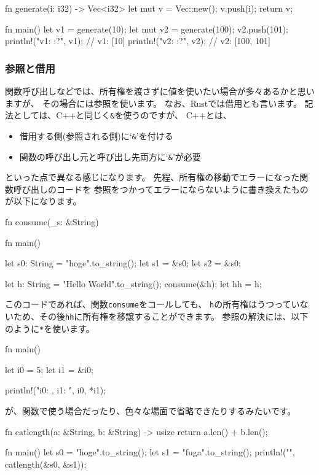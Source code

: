 \documentclass[mingoth,a4paper]{jsarticle}
\begin{document}
\begin{commandline}
fn generate(i: i32) -> Vec<i32> {
    let mut v = Vec::new();
    v.push(i);
    return v;
}

fn main() {
    let v1 = generate(10);
    let mut v2 = generate(100);
    v2.push(101);
    println!("v1: {:?}", v1); // v1: [10]
    println!("v2: {:?}", v2); // v2: [100, 101]
}
\end{commandline}

\subsubsection{参照と借用}

関数呼び出しなどでは、所有権を渡さずに値を使いたい場合が多々あるかと思いますが、
その場合には参照を使います。
なお、Rustでは借用とも言います。
記法としては、C++と同じく\texttt{\&}を使うのですが、
C++とは、
\begin{itemize}
 \item 借用する側(参照される側)に`\texttt{\&}'を付ける
 \item 関数の呼び出し元と呼び出し先両方に`\texttt{\&}'が必要
\end{itemize}
といった点で異なる感じになります。
先程、所有権の移動でエラーになった関数呼び出しのコードを
参照をつかってエラーにならないように書き換えたものが以下になります。

\begin{commandline}
fn consume(_s: &String) {}

fn main() {
    let s0: String = "hoge".to_string();
    let s1 = &s0;
    let s2 = &s0;

    let h: String = "Hello World".to_string();
    consume(&h);
    let hh = h;
}
\end{commandline}

このコードであれば、関数\texttt{consume}をコールしても、
\texttt{h}の所有権はうつっていないため、その後\texttt{hh}に所有権を移譲することができます。
参照の解決には、以下のように\texttt{*}を使います。

\begin{commandline}
fn main() {
    let i0 = 5;
    let i1 = &i0;

    println!("i0: {}, i1: {}", i0, *i1);
}
\end{commandline}

が、関数で使う場合だったり、色々な場面で省略できたりするみたいです。

\begin{commandline}
fn catlength(a: &String, b: &String) -> usize {
    return a.len() + b.len();
}

fn main() {
    let s0 = "hoge".to_string();
    let s1 = "fuga".to_string();
    println!("{}", catlength(&s0, &s1));
}
\end{commandline}
\end{document}
